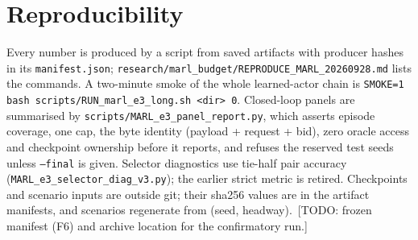 \documentclass[11pt]{article}
\theoremstyle{definition}
\newif\ifshownotes\shownotestrue
\newcommand{\TODO}[1]{\ifshownotes{\color{todocol}\,\textsf{\footnotesize[TODO: #1]}}\fi}
\begin{document}
\section{Reproducibility}
Every number is produced by a script from saved artifacts with producer hashes in its \texttt{manifest.json};
\texttt{research/marl\_budget/REPRODUCE\_MARL\_20260928.md} lists the commands. A two-minute smoke of the whole
learned-actor chain is \texttt{SMOKE=1 bash scripts/RUN\_marl\_e3\_long.sh <dir> 0}. Closed-loop panels are summarised
by \texttt{scripts/MARL\_e3\_panel\_report.py}, which asserts episode coverage, one cap, the byte identity
(payload + request + bid), zero oracle access and checkpoint ownership before it reports, and refuses the reserved
test seeds unless \texttt{--final} is given. Selector diagnostics use tie-half pair accuracy
(\texttt{MARL\_e3\_selector\_diag\_v3.py}); the earlier strict metric is retired. Checkpoints and scenario inputs
are outside git; their sha256 values are in the artifact manifests, and scenarios regenerate from (seed, headway).
\TODO{frozen manifest (F6) and archive location for the confirmatory run.}
\end{document}

